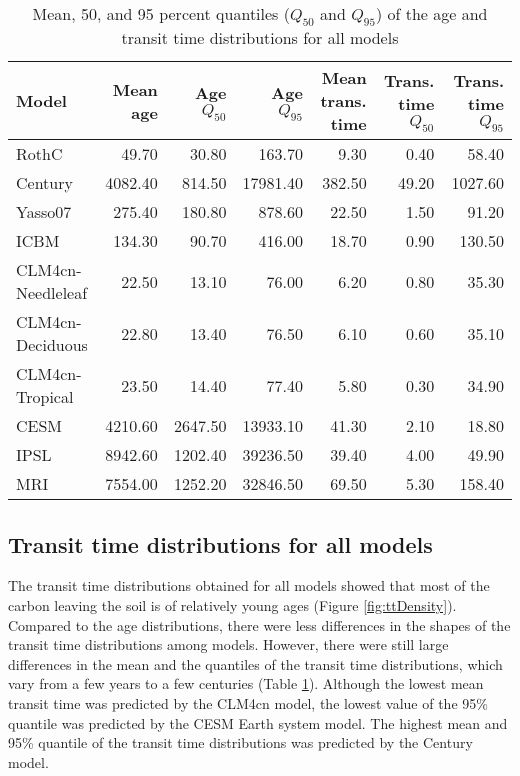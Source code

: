 \documentclass[draft,linenumbers]{agujournal}
\begin{document}
%
\begin{table}[ht]
\centering
\caption{Mean, 50, and 95 percent quantiles ($Q_{50}$ and $Q_{95}$) of the age and transit time distributions for all models} 
\label{tab:Qs}
\begin{tabular}{lrrrrrr}
  \toprule
Model & Mean age & Age $Q_{50}$ & Age $Q_{95}$ & Mean trans. time & Trans. time $Q_{50}$ & Trans. time $Q_{95}$ \\ 
  \midrule
RothC & 49.70 & 30.80 & 163.70 & 9.30 & 0.40 & 58.40 \\ 
  Century & 4082.40 & 814.50 & 17981.40 & 382.50 & 49.20 & 1027.60 \\ 
  Yasso07 & 275.40 & 180.80 & 878.60 & 22.50 & 1.50 & 91.20 \\ 
  ICBM & 134.30 & 90.70 & 416.00 & 18.70 & 0.90 & 130.50 \\ 
  CLM4cn-Needleleaf & 22.50 & 13.10 & 76.00 & 6.20 & 0.80 & 35.30 \\ 
  CLM4cn-Deciduous & 22.80 & 13.40 & 76.50 & 6.10 & 0.60 & 35.10 \\ 
  CLM4cn-Tropical & 23.50 & 14.40 & 77.40 & 5.80 & 0.30 & 34.90 \\ 
  CESM & 4210.60 & 2647.50 & 13933.10 & 41.30 & 2.10 & 18.80 \\ 
  IPSL & 8942.60 & 1202.40 & 39236.50 & 39.40 & 4.00 & 49.90 \\ 
  MRI & 7554.00 & 1252.20 & 32846.50 & 69.50 & 5.30 & 158.40 \\ 
   \bottomrule
\end{tabular}
\end{table}

\subsection{Transit time distributions for all models}
The transit time distributions obtained for all models showed that most of the carbon leaving the soil is of relatively young ages (Figure \ref{fig:ttDensity}). Compared to the age distributions, there were less differences in the shapes of the transit time distributions among models. However, there were still large differences in the mean and the quantiles of the transit time distributions,  which vary from a few years to a few centuries (Table \ref{tab:Qs}). Although the lowest mean transit time was predicted by the CLM4cn model, the lowest value of the 95\% quantile was predicted by the CESM Earth system model. The highest mean and 95\% quantile of the transit time distributions was predicted by the Century model. 
\end{document}
